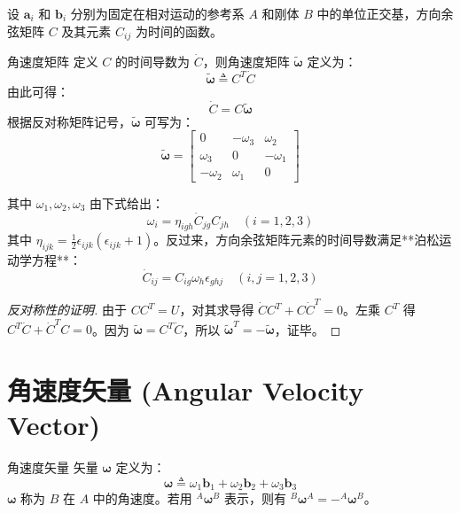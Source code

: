 设 \(\mathbf{a}_i\) 和 \(\mathbf{b}_i\) 分别为固定在相对运动的参考系 \(A\) 和刚体 \(B\) 中的单位正交基，方向余弦矩阵 \(C\) 及其元素 \(C_{ij}\) 为时间的函数。
\begin{mydefinition}{角速度矩阵}
定义 \(C\) 的时间导数为 \(\dot{C}\)，则角速度矩阵 \(\widetilde{\boldsymbol{\omega}}\) 定义为：
\begin{equation}
\widetilde{\boldsymbol{\omega}} \triangleq C^T \dot{C} \tag{2}
\end{equation}
由此可得：
\begin{equation}
\dot{C} = C \widetilde{\boldsymbol{\omega}} \tag{3}
\end{equation}
根据反对称矩阵记号，\(\widetilde{\boldsymbol{\omega}}\) 可写为：
\begin{equation}
\widetilde{\boldsymbol{\omega}} = \begin{bmatrix} 0 & -\omega_3 & \omega_2 \\ \omega_3 & 0 & -\omega_1 \\ -\omega_2 & \omega_1 & 0 \end{bmatrix} \tag{4}
\end{equation}
\end{mydefinition}

其中 \(\omega_1, \omega_2, \omega_3\) 由下式给出：
\begin{equation}
\omega_i = \eta_{igh} \dot{C}_{jg} C_{jh} \quad (i=1,2,3) \tag{9}
\end{equation}
其中 \(\eta_{ijk} = \frac{1}{2} \epsilon_{ijk} (\epsilon_{ijk} + 1)\)。反过来，方向余弦矩阵元素的时间导数满足**泊松运动学方程**：
\begin{equation}
\dot{C}_{ij} = C_{ig} \omega_h \epsilon_{ghj} \quad (i,j=1,2,3) \tag{10}
\end{equation}

\begin{proof}[反对称性的证明]
由于 \(C C^T = U\)，对其求导得 \(\dot{C} C^T + C \dot{C}^T = 0\)。左乘 \(C^T\) 得 \(C^T \dot{C} + \dot{C}^T C = 0\)。因为 \(\widetilde{\boldsymbol{\omega}} = C^T \dot{C}\)，所以 \(\widetilde{\boldsymbol{\omega}}^T = -\widetilde{\boldsymbol{\omega}}\)，证毕。
\end{proof}

\section{角速度矢量 (Angular Velocity Vector)}

\begin{mydefinition}{角速度矢量}
矢量 \(\boldsymbol{\omega}\) 定义为：
\begin{equation}
\boldsymbol{\omega} \triangleq \omega_1 \mathbf{b}_1 + \omega_2 \mathbf{b}_2 + \omega_3 \mathbf{b}_3 \tag{1}
\end{equation}
\(\boldsymbol{\omega}\) 称为 \(B\) 在 \(A\) 中的角速度。若用 \({}^A \boldsymbol{\omega}^B\) 表示，则有 \({}^B \boldsymbol{\omega}^A = -{}^A \boldsymbol{\omega}^B\)。
\end{mydefinition}

